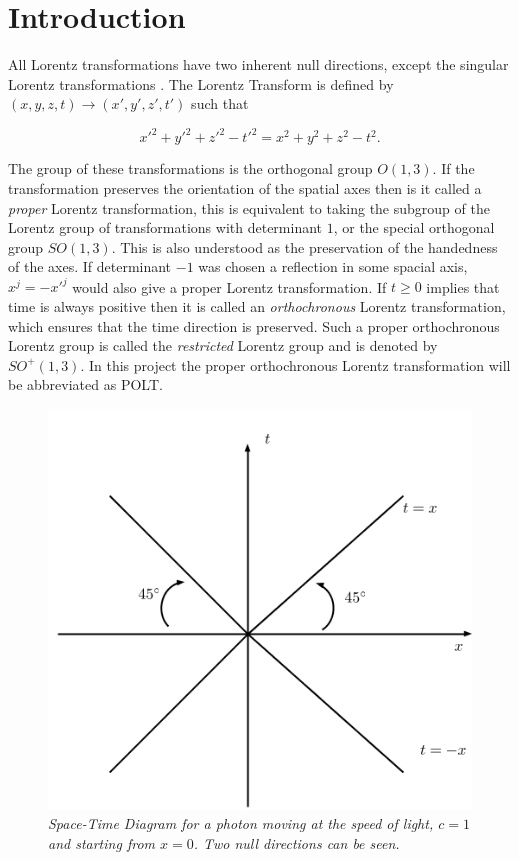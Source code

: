 \section{Introduction}

All Lorentz transformations have two inherent null directions, except the singular Lorentz transformations \cite[p. 85]{Relativity_Synge}. The Lorentz Transform is defined by $(x,y,z,t) \rightarrow (x',y',z',t')$ such that

\begin{equation*}
{x'}^2 + {y'}^2 + {z'}^2 - {t'}^2 = x^2 + y^2 + z^2 - t^2.
\end{equation*}

\noindent The group of these transformations is the orthogonal group $O(1,3)$. If the transformation preserves the orientation of the spatial axes then is it called a \textit{proper} Lorentz transformation, this is equivalent to taking the subgroup of the Lorentz group of transformations with determinant $1$, or the special orthogonal group $SO(1,3)$. This is also understood as the preservation of the handedness of the axes. If determinant $-1$ was chosen a reflection in some spacial axis, $x^j = -{x'}^j$ would also give a proper Lorentz transformation. If $t \geq 0$ implies that time is always positive then it is called an \textit{orthochronous} Lorentz transformation, which ensures that the time direction is preserved. Such a proper orthochronous Lorentz group is called the \textit{restricted} Lorentz group and is denoted by $SO^{+}(1,3)$. In this project the proper orthochronous Lorentz transformation will be abbreviated as POLT. 

\begin{figure}[h!]
\begin{center}
\caption{\textit{Space-Time Diagram for a photon moving at the speed of light, $c=1$ and starting from $x = 0$. Two null directions can be seen.}}
\label{figure_Photon_Space_Time}
\includegraphics[scale=0.8]{figs/1_1.jpg}
\end{center}
\end{figure}

